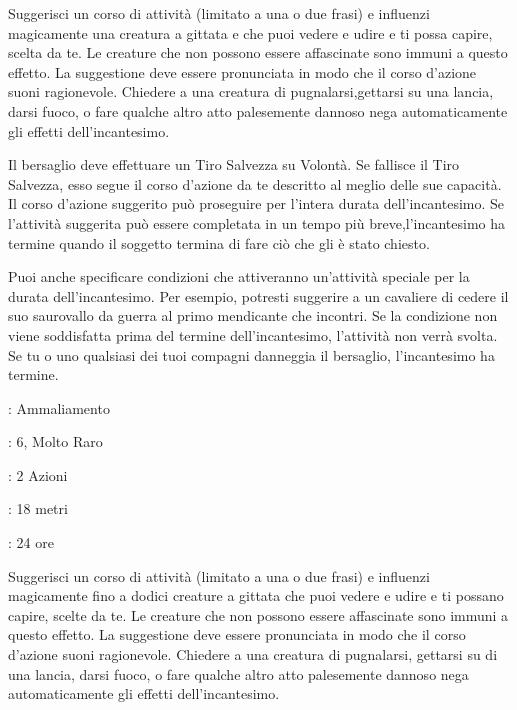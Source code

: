 \begin{multicols}{2}
Suggerisci un corso di attività (limitato a una o due frasi) e influenzi magicamente una creatura a gittata e che puoi vedere e udire e ti possa capire, scelta da te. Le creature che non possono essere affascinate sono immuni a questo effetto. La suggestione deve essere pronunciata in modo che il corso d'azione suoni ragionevole. Chiedere a una creatura di pugnalarsi,gettarsi su una lancia, darsi fuoco, o fare qualche altro atto palesemente dannoso nega automaticamente gli effetti dell'incantesimo.

Il bersaglio deve effettuare un Tiro Salvezza su Volontà. Se fallisce il Tiro Salvezza, esso segue il corso d'azione da te descritto al meglio delle sue capacità. Il corso d'azione suggerito può proseguire per l'intera durata dell'incantesimo. Se l'attività suggerita può essere completata in un tempo più breve,l'incantesimo ha termine quando il soggetto termina di fare ciò che gli è stato chiesto.

Puoi anche specificare condizioni che attiveranno un'attività speciale per la durata dell'incantesimo. Per esempio, potresti suggerire a un cavaliere di cedere il suo saurovallo da guerra al primo mendicante che incontri. Se la condizione non viene soddisfatta prima del termine dell'incantesimo, l'attività non verrà svolta. Se tu o uno qualsiasi dei tuoi compagni danneggia il bersaglio, l'incantesimo ha termine.

\noindent\colorbox{OBSSgold!10}{
\begin{minipage}{0.95\linewidth}
\begin{description}[noitemsep, topsep=0pt, parsep=0pt, partopsep=0pt, leftmargin=0cm, labelwidth=1.3cm]
	\item[\textbf{Lista}]: Ammaliamento
	\item[\textbf{Livello}]: 6, Molto Raro
	\item[\textbf{Lancio}]: 2 Azioni
	\item[\textbf{Gittata}]: 18 metri
	\item[\textbf{Durata}]: 24 ore
\end{description}
\end{minipage}}\smallskip

Suggerisci un corso di attività (limitato a una o due frasi) e influenzi magicamente fino a dodici creature a gittata che puoi vedere e udire e ti possano capire, scelte da te. Le creature che non possono essere affascinate sono immuni a questo effetto. La suggestione deve essere pronunciata in modo che il corso d'azione suoni ragionevole. Chiedere a una creatura di pugnalarsi, gettarsi su di una lancia, darsi fuoco, o fare qualche altro atto palesemente dannoso nega automaticamente gli effetti dell'incantesimo.


\end{multicols}
